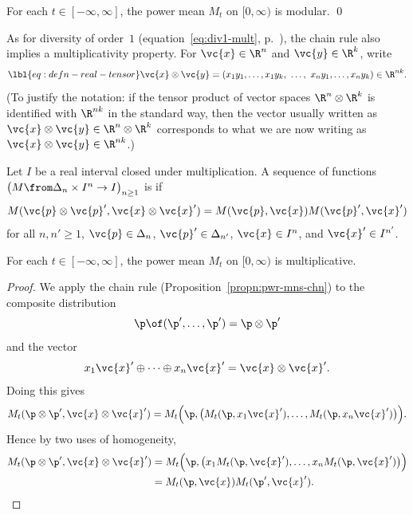 \begin{cor}
% 
For each $t \in [-\infty, \infty]$, the power mean $M_t$ on $[0, \infty)$
is modular. 
\qed
\end{cor}

As for diversity of order~$1$ (equation~\eqref{eq:div1-mult},
p.~\pageref{eq:div1-mult}), the chain rule also implies a
multiplicativity property.  For $\vc{x} \in \R^n$ and $\vc{y} \in \R^k$,
write
% 
\begin{equation}
\lbl{eq:defn-real-tensor}
\vc{x} \otimes \vc{y}
=
(x_1 y_1, \ldots, x_1 y_k, 
\ \ldots, \ 
x_n y_1, \ldots, x_n y_k)
\in \R^{nk}.
\end{equation}
% 
(To justify the notation: if the tensor product of vector spaces $\R^n
\otimes \R^k$ is identified with $\R^{nk}$ in the standard way, then the
vector usually written as $\vc{x} \otimes \vc{y} \in \R^n \otimes \R^k$
corresponds to what we are now writing as $\vc{x} \otimes \vc{y} \in
\R^{nk}$.)

\begin{defn}
Let $I$ be a real interval closed under multiplication.  A sequence of
functions $\bigl( M \from \Delta_n \times I^n \to I \bigr)_{n \geq 1}$ is
\demph{multiplicative}%
%
%
if
\[
M(\vc{p} \otimes \vc{p}', \vc{x} \otimes \vc{x}')
=
M(\vc{p}, \vc{x}) M(\vc{p}', \vc{x}')
\]
for all $n, n' \geq 1$, $\vc{p} \in \Delta_n$, $\vc{p}' \in \Delta_{n'}$,
$\vc{x} \in I^n$, and $\vc{x}' \in I^{n'}$.  
\end{defn}

\begin{cor}
% 
For each $t \in [-\infty, \infty]$, the power mean $M_t$ on $[0, \infty)$
is multiplicative. 
\end{cor}

\begin{proof}
We apply the chain rule (Proposition~\ref{propn:pwr-mns-chn}) to the
composite distribution
\[
\p \of (\p', \ldots, \p') = \p \otimes \p'
\]
and the vector
\[
x_1 \vc{x}' \oplus \cdots \oplus x_n \vc{x}' = \vc{x} \otimes \vc{x}'.
\]
Doing this gives
\[
M_t(\p \otimes \p', \vc{x} \otimes \vc{x}')
=
M_t\Bigl( 
\p, 
\bigl(
M_t(\p, x_1\vc{x}'), \ldots, M_t(\p, x_n\vc{x}')
\bigr)
\Bigr).
\]
Hence by two uses of homogeneity,
% 
\begin{align*}
M_t(\p \otimes \p', \vc{x} \otimes \vc{x}')     &
=
M_t\Bigl( 
\p, 
\bigl(
x_1 M_t(\p, \vc{x}'), \ldots, x_n M_t(\p, \vc{x}')
\bigr)
\Bigr)  \\
&
=
M_t(\p, \vc{x}) M_t(\p', \vc{x}').
\end{align*}
\end{proof}

